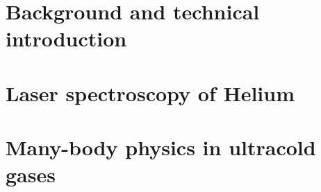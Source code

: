 \documentclass[12pt,a4paper,twoside]{book}
\begin{document}

\frontmatter


\setcounter{tocdepth}{1}
\tableofcontents

\mainmatter



\part{Background and technical introduction}




\part{Laser spectroscopy of Helium}




\part{Many-body physics in ultracold gases}
% 






\backmatter
\printbibliography




% 
\end{document}
